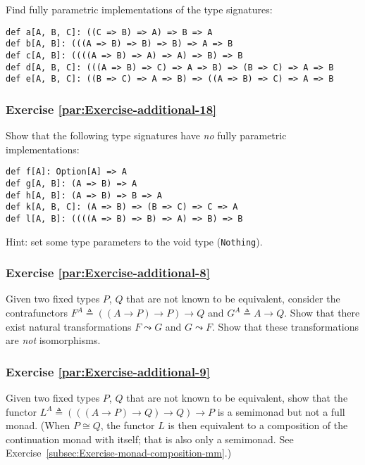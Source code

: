Find fully parametric implementations of the type signatures:

\begin{lstlisting}
def a[A, B, C]: ((C => B) => A) => B => A
def b[A, B]: (((A => B) => B) => B) => A => B
def c[A, B]: ((((A => B) => A) => A) => B) => B
def d[A, B, C]: (((A => B) => C) => A => B) => (B => C) => A => B
def e[A, B, C]: ((B => C) => A => B) => ((A => B) => C) => A => B
\end{lstlisting}


\subsubsection{Exercise \label{par:Exercise-additional-18}\ref{par:Exercise-additional-18}}

Show that the following type signatures have \emph{no} fully parametric
implementations:

\begin{lstlisting}
def f[A]: Option[A] => A
def g[A, B]: (A => B) => A
def h[A, B]: (A => B) => B => A
def k[A, B, C]: (A => B) => (B => C) => C => A
def l[A, B]: ((((A => B) => B) => A) => B) => B
\end{lstlisting}

Hint: set some type parameters to the void type (\lstinline!Nothing!).

\subsubsection{Exercise \label{par:Exercise-additional-8}\ref{par:Exercise-additional-8}}

Given two fixed types $P$, $Q$ that are not known to be equivalent,
consider the contrafunctors $F^{A}\triangleq\left(\left(A\rightarrow P\right)\rightarrow P\right)\rightarrow Q$
and $G^{A}\triangleq A\rightarrow Q$. Show that there exist natural
transformations $F\leadsto G$ and $G\leadsto F$. Show that these
transformations are \emph{not} isomorphisms.

\subsubsection{Exercise \label{par:Exercise-additional-9}\ref{par:Exercise-additional-9}}

Given two fixed types $P$, $Q$ that are not known to be equivalent,
show that the functor $L^{A}\triangleq\left(\left(\left(A\rightarrow P\right)\rightarrow Q\right)\rightarrow Q\right)\rightarrow P$
is a semimonad but not a full monad. (When $P\cong Q$, the functor
$L$ is then equivalent to a composition of the continuation monad
with itself; that is also only a semimonad. See Exercise~\ref{subsec:Exercise-monad-composition-mm}.)

